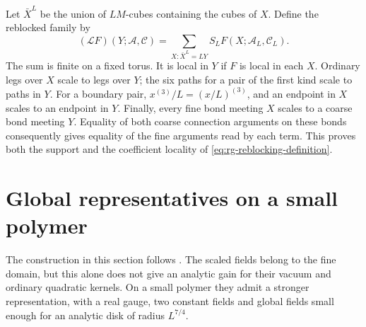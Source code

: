 Let $\bar X^L$ be the union of $LM$-cubes containing the cubes
of $X$. Define the reblocked family by
\begin{equation}\label{eq:rg-reblocking-definition}
 (\mathcal L F)(Y;\mathscr A,\mathscr C)
       =\sum_{X:\bar X^L=LY}S_L
                          F(X;\mathscr A_L,\mathscr C_L).
\end{equation}
The sum is finite on a fixed torus. It is local in $Y$ if
$F$ is local in each $X$. Ordinary legs over $X$ scale to
legs over $Y$; the six paths for a pair of the first kind
scale to paths in $Y$. For a boundary pair,
$x^{(3)}/L=(x/L)^{(3)}$, and an endpoint in $X$ scales to
an endpoint in $Y$. Finally, every fine bond meeting $X$
scales to a coarse bond meeting $Y$. Equality of both
coarse connection arguments on these bonds consequently
gives equality of the fine arguments read by each term.
This proves both the support and the coefficient locality
of \eqref{eq:rg-reblocking-definition}.
\section{Global representatives on a small polymer}
\label{subsec:rg-small-polymer-gauge}

The construction in this section follows \cite[\S12.7]{QED3Manuscript}.
The scaled fields belong to the fine domain, but this alone
does not give an analytic gain for their vacuum and ordinary
quadratic kernels. On a small polymer they admit a stronger
representation, with a real gauge, two constant fields and
global fields small enough for an analytic disk of radius
$L^{7/4}$.

